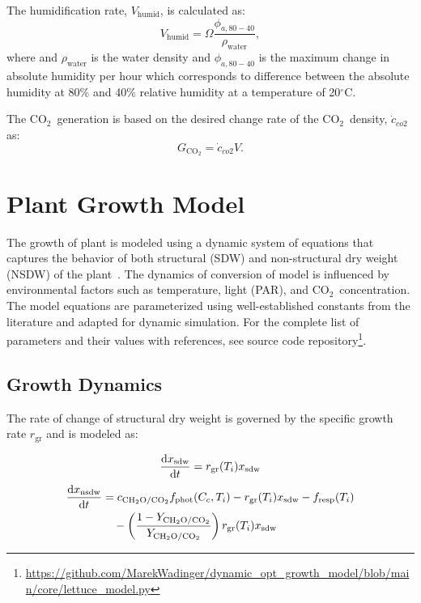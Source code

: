 \documentclass[conference]{IEEEtran}
\newcommand{\ui}[2]{#1_{\mathrm{#2}}}
\newcommand{\coo}{\ensuremath{\mathrm{CO_2}}}
\newcommand{\chho}{\ensuremath{\mathrm{CH_2O}}}
\begin{document}
The humidification rate, \( V_{\text{humid}} \), is calculated as:
\begin{equation}
    V_{\text{humid}} = \Omega \frac{\phi_{a, 80 - 40}}{\rho_{\text{water}}},
\end{equation}
where and \( \rho_{\text{water}} \) is the water density and  \( \phi_{a, 80 - 40} \) is the maximum change in absolute humidity per hour which corresponds to difference between the absolute humidity at 80\% and 40\% relative humidity at a temperature of 20\( ^\circ \)C.

The \coo\ generation is based on the desired change rate of the \coo\ density, \( \dot{c}_{co2} \) as:
\begin{equation}
    G_{\coo} = \dot{c}_{co2}  V.
\end{equation}

\section{Plant Growth Model}\label{sec:lettuce_growth}
The growth of plant is modeled using a dynamic system of equations that captures the behavior of both structural (SDW) and non-structural dry weight (NSDW) of the plant~\cite{VANHENTEN199455}. The dynamics of conversion of  model is influenced by environmental factors such as temperature, light (PAR), and \coo\ concentration. The model equations are parameterized using well-established constants from the literature and adapted for dynamic simulation. For the complete list of parameters and their values with references, see source code repository\footnote{\url{https://github.com/MarekWadinger/dynamic_opt_growth_model/blob/main/core/lettuce_model.py}}.

\subsection{Growth Dynamics} The rate of change of structural dry weight is governed by the specific growth rate \( \ui{r}{gr} \) and is modeled as:

\begin{equation}
    \diff{\ui{x}{sdw}}{t} = \ui{r}{gr}(T_i) \ui{x}{sdw}
\end{equation}
\begin{equation}
    \begin{aligned}
        \diff{\ui{x}{nsdw}}{t} & = c_{\chho/\coo} \ui{f}{phot}(C_c, T_i) - \ui{r}{gr}(T_i) \ui{x}{sdw} - \ui{f}{resp}(T_i)    \\
                               & \quad - \left( \frac{1 - Y_{\chho/\coo}}{Y_{\chho/\coo}} \right) \ui{r}{gr}(T_i) \ui{x}{sdw}
    \end{aligned}
\end{equation}
\end{document}
